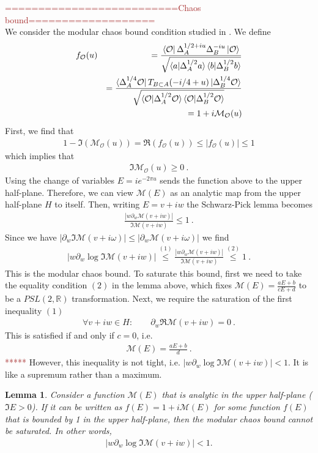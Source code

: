\documentclass[a4paper,11pt]{article}
\newtheorem{lemma}[theorem]{Lemma}
\theoremstyle{definition}
\newcommand{\nn}{\nonumber}
\newcommand{\mO}{\mathcal{O}}
\newcommand{\mM}{\mathcal{M}}
\newcommand{\p}{\partial}
\newcommand{\KL}[1]{\textcolor{brown}{#1}}
\begin{document}
\KL{==========================Chaos bound===================}\\
We consider the modular chaos bound condition studied in \cite{}. We define
\begin{eqnarray}
    f_\mO(u)&&=\frac{\bra{\mO}\Delta_A^{1/2+iu}\Delta_B^{-iu}\ket{\mO}}{\sqrt{\braket{a|\Delta_A^{1/2}a}\braket{b|\Delta_B^{1/2}b}}}\\
    &&=\frac{\bra{\Delta_A^{1/4}\mO} T_{B\subset A}(-i/4+u)\ket{\Delta_B^{1/4} \mO}}{\sqrt{\braket{\mO|\Delta_A^{1/2}\mO}\braket{\mO|\Delta_B^{1/2}\mO}}}\nn\\
    &&=1+i \mathcal{M}_{\mO}(u)
\end{eqnarray}
First, we find that 
\begin{eqnarray}
    1-\Im(\mathcal{M}_\mO(u))=\Re(f_\mO(u))\leq |f_\mO(u)|\leq 1
\end{eqnarray}
which implies that 
\begin{eqnarray}
    \Im\mathcal{M}_\mO(u)\geq 0\ .
\end{eqnarray}
Using the change of variables $E=ie^{-2\pi u}$ sends the function above to the upper half-plane. Therefore, we can view $\mM(E)$ as an analytic map from the upper half-plane $H$ to itself. Then, writing $E=v+iw$ the Schwarz-Pick lemma becomes
\begin{eqnarray}
    \frac{|w \p_w \mM(v+iw)|}{\Im \mM(v+iw)}\leq 1\ . 
\end{eqnarray}
Since we have $|\p_w \Im\mM(v+i\omega)|\leq |\p_w \mM(v+i\omega)|$ we find
\begin{eqnarray}
    |w\p_w \log \Im \mM(v+iw)| \stackrel{(1)}{\leq} \frac{|w \p_w \mM(v+iw)|}{\Im \mM(v+iw)} \stackrel{(2)}{\leq} 1\ .
\end{eqnarray}
This is the modular chaos bound. To saturate this bound, first we need to take the equality condition $(2)$ in the lemma above, which fixes $\mM(E)=\frac{a E+b}{c E+d}$ to be a $PSL(2,\mathbb{R})$ transformation. Next, we require the saturation of the first inequality $(1)$
\begin{eqnarray}
    \forall v+iw\in H:\qquad \p_w \Re \mM(v+iw)=0\ .
\end{eqnarray}
This is satisfied if and only if $c=0$, i.e.
\begin{eqnarray}
    \mM(E)=\frac{a E+b}{d}\ .
\end{eqnarray}
\KL{*****} However, this inequality is not tight, i.e. $|w\p_w \log \Im \mM(v+iw)| < 1$. It is like a supremum rather than a maximum.
\begin{lemma}
    Consider a function $\mM(E)$ that is analytic in the upper half-plane ($\Im E > 0$). If it can be written as $f(E) = 1+i\mM(E)$ for some function $f(E)$ that is bounded by 1 in the upper half-plane, then the modular chaos bound cannot be saturated. In other words,
    \begin{align}
        |w\p_w \log \Im \mM(v+iw)| < 1.
    \end{align}
\end{lemma}
\end{document}
